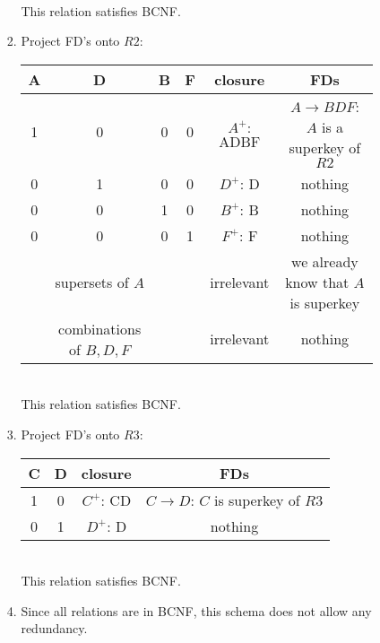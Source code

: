\documentclass{csc_assignment2}
\begin{document}
\begin{description}
\begin{enumerate}
\begin{enumerate}
\begin{enumerate}
\begin{tabular}{ |c|c|c|c|c| }
 \hline
\end{tabular} \\[3pt] This relation satisfies BCNF.
\item Project FD's onto $R2$:\\
\begin{tabular}{ |c|c|c|c|c|c| } 
 \hline
 A & D & B & F & closure & FDs \\
 \hline
 1 & 0 & 0 & 0 & $A^{+}$: $\text{ADBF}$ & $A \rightarrow BDF$: $A$ is a superkey of $R2$ \\ 
 \hline
 0 & 1 & 0 & 0 & $D^{+}$: $\text{D}$ & nothing \\ 
 \hline
 0 & 0 & 1 & 0 & $B^{+}$: $\text{B}$ & nothing \\
 \hline
 0 & 0 & 0 & 1 & $F^{+}$: $\text{F}$ & nothing \\
 \hline
 & supersets of $A$ &&& irrelevant & we already know that $A$ is superkey \\
 \hline
 & combinations of $B, D, F$ &&& irrelevant & nothing \\
 \hline
\end{tabular} \\[3pt] This relation satisfies BCNF.
\item Project FD's onto $R3$:\\
\begin{tabular}{ |c|c|c|c| } 
 \hline
 C & D & closure & FDs \\
 \hline
 1 & 0 & $C^{+}$: $\text{CD}$ & $C \rightarrow D$: $C$ is superkey of $R3$ \\ 
 \hline
 0 & 1 & $D^{+}$: $\text{D}$ & nothing \\ 
 \hline
\end{tabular} \\[3pt] This relation satisfies BCNF.
\item Since all relations are in BCNF, this schema does not allow any redundancy. 
\end{enumerate}
\end{enumerate}
\end{enumerate}
\end{description}
\end{document}
